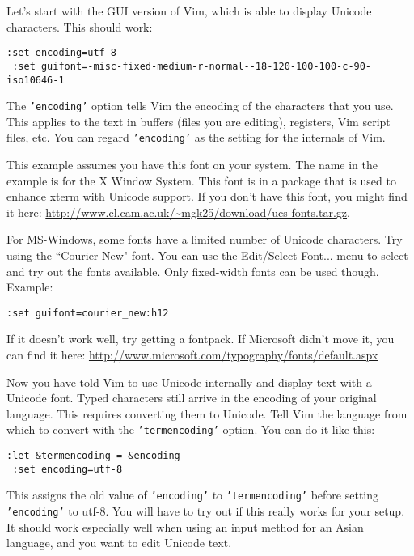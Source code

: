 Let's start with the GUI version of Vim, which is able to display Unicode characters.
This should work:

\begin{Verbatim}[samepage=true]
 :set encoding=utf-8
 :set guifont=-misc-fixed-medium-r-normal--18-120-100-100-c-90-iso10646-1
\end{Verbatim}

The \texttt{'encoding'} option tells Vim the encoding of the characters that you use.
This applies to the text in buffers (files you are editing), registers, Vim script files, etc.
You can regard \texttt{'encoding'} as the setting for the internals of Vim.

This example assumes you have this font on your system.
The name in the example is for the X Window System.
This font is in a package that is used to enhance xterm with Unicode support.
If you don't have this font, you might find it here: \url{http://www.cl.cam.ac.uk/~mgk25/download/ucs-fonts.tar.gz}.

For MS-Windows, some fonts have a limited number of Unicode characters.
Try using the ``Courier New" font.
You can use the Edit/Select Font... menu to select and try out the fonts available.
Only fixed-width fonts can be used though.
Example:

\begin{Verbatim}[samepage=true]
 :set guifont=courier_new:h12
\end{Verbatim}

If it doesn't work well, try getting a fontpack.
If Microsoft didn't move it, you can find it here: \url{http://www.microsoft.com/typography/fonts/default.aspx}

Now you have told Vim to use Unicode internally and display text with a Unicode font.
Typed characters still arrive in the encoding of your original language.
This requires converting them to Unicode.
Tell Vim the language from which to convert with the \texttt{'termencoding'} option.
You can do it like this:

\begin{Verbatim}[samepage=true]
 :let &termencoding = &encoding
 :set encoding=utf-8
\end{Verbatim}

This assigns the old value of \texttt{'encoding'} to \texttt{'termencoding'} before setting \texttt{'encoding'} to utf-8.
You will have to try out if this really works for your setup.
It should work especially well when using an input method for an Asian language, and you want to edit Unicode text.

